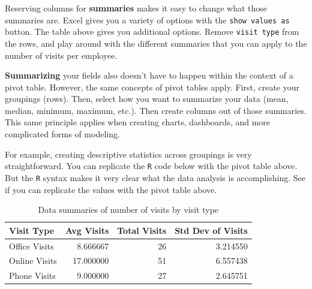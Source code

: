 \documentclass[
]{book}
\newenvironment{Shaded}{\begin{snugshade}}{\end{snugshade}}
\newcommand{\DataTypeTok}[1]{\textcolor[rgb]{0.13,0.29,0.53}{#1}}
\newcommand{\KeywordTok}[1]{\textcolor[rgb]{0.13,0.29,0.53}{\textbf{#1}}}
\newcommand{\NormalTok}[1]{#1}
\newcommand{\OperatorTok}[1]{\textcolor[rgb]{0.81,0.36,0.00}{\textbf{#1}}}
\newcommand{\StringTok}[1]{\textcolor[rgb]{0.31,0.60,0.02}{#1}}
\begin{document}
Reserving columns for \textbf{summaries} makes it easy to change what those summaries are. Excel gives you a variety of options with the \texttt{show\ values\ as} button. The table above gives you additional options. Remove \texttt{visit\ type} from the rows, and play around with the different summaries that you can apply to the number of visits per employee.

\textbf{Summarizing} your fields also doesn't have to happen within the context of a pivot table. However, the same concepts of pivot tables apply. First, create your groupings (rows). Then, select how you want to summarize your data (mean, median, minimum, maximum, etc.). Then create columns out of those summaries. This same principle applies when creating charts, dashboards, and more complicated forms of modeling.

For example, creating descriptive statistics across groupings is very straightforward. You can replicate the \texttt{R} code below with the pivot table above. But the \texttt{R} syntax makes it very clear what the data analysis is accomplishing. See if you can replicate the values with the pivot table above.

\begin{Shaded}
\end{Shaded}

\begin{table}

\caption{\label{tab:unnamed-chunk-11}Data summaries of number of visits by visit type}
\centering
\begin{tabular}[t]{l|r|r|r}
\hline
Visit Type & Avg Visits & Total Visits & Std Dev of Visits\\
\hline
Office Visits & 8.666667 & 26 & 3.214550\\
\hline
Online Visits & 17.000000 & 51 & 6.557438\\
\hline
Phone Visits & 9.000000 & 27 & 2.645751\\
\hline
\end{tabular}
\end{table}
\end{document}
